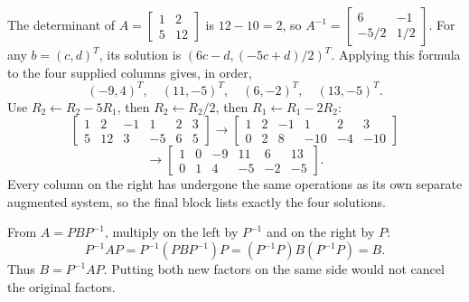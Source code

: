 The determinant of $A=\begin{bmatrix}1&2\\5&12\end{bmatrix}$ is $12-10=2$,
so $A^{-1}=\begin{bmatrix}6&-1\\-5/2&1/2\end{bmatrix}$.
For any $b=(c,d)^T$, its solution is $(6c-d,(-5c+d)/2)^T$.
Applying this formula to the four supplied columns gives, in order,
\[
 (-9,4)^T,\quad(11,-5)^T,\quad(6,-2)^T,\quad(13,-5)^T.
\]
Use $R_2\gets R_2-5R_1$, then $R_2\gets R_2/2$, then
$R_1\gets R_1-2R_2$:
\[
 \left[\begin{array}{rr|rrrr}1&2&-1&1&2&3\\5&12&3&-5&6&5\end{array}\right]
 \longrightarrow
 \left[\begin{array}{rr|rrrr}1&2&-1&1&2&3\\0&2&8&-10&-4&-10\end{array}\right]
\]
\[
 \longrightarrow
 \left[\begin{array}{rr|rrrr}1&0&-9&11&6&13\\0&1&4&-5&-2&-5\end{array}\right].
\]
Every column on the right has undergone the same operations as its own
separate augmented system, so the final block lists exactly the four solutions.

From $A=PBP^{-1}$, multiply on the left by $P^{-1}$ and on the right by $P$:
\[
 P^{-1}AP=P^{-1}(PBP^{-1})P=(P^{-1}P)B(P^{-1}P)=B.
\]
Thus $\boxed{B=P^{-1}AP}$. Putting both new factors on the same side
would not cancel the original factors.

